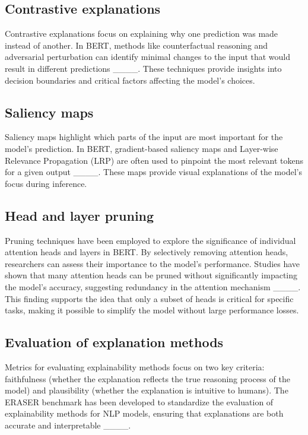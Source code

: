 \subsection{Contrastive explanations}
Contrastive explanations focus on explaining why one prediction was made instead of another. In BERT, methods like counterfactual reasoning and adversarial perturbation can identify minimal changes to the input that would result in different predictions ____. These techniques provide insights into decision boundaries and critical factors affecting the model’s choices.

\subsection{Saliency maps}
Saliency maps highlight which parts of the input are most important for the model's prediction. In BERT, gradient-based saliency maps and Layer-wise Relevance Propagation (LRP) are often used to pinpoint the most relevant tokens for a given output ____. These maps provide visual explanations of the model’s focus during inference.

\subsection{Head and layer pruning}
Pruning techniques have been employed to explore the significance of individual attention heads and layers in BERT. By selectively removing attention heads, researchers can assess their importance to the model's performance. Studies have shown that many attention heads can be pruned without significantly impacting the model’s accuracy, suggesting redundancy in the attention mechanism ____. This finding supports the idea that only a subset of heads is critical for specific tasks, making it possible to simplify the model without large performance losses.

\subsection{Evaluation of explanation methods}
Metrics for evaluating explainability methods focus on two key criteria: faithfulness (whether the explanation reflects the true reasoning process of the model) and plausibility (whether the explanation is intuitive to humans). The ERASER benchmark has been developed to standardize the evaluation of explainability methods for NLP models, ensuring that explanations are both accurate and interpretable ____.